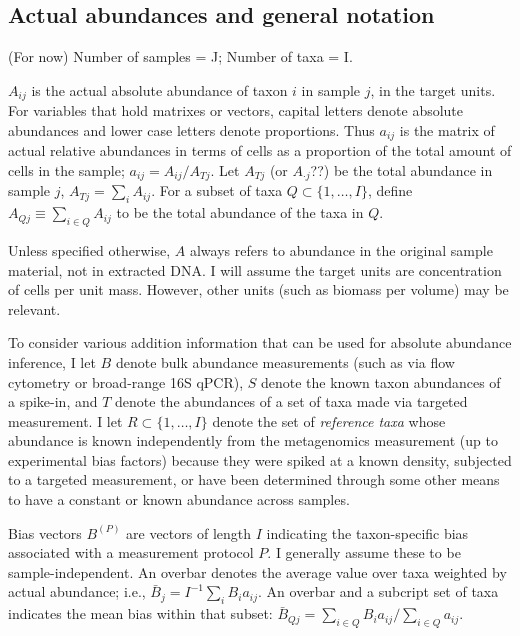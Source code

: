 \documentclass[
]{article}
\theoremstyle{definition}
\theoremstyle{definition}
\theoremstyle{definition}
\theoremstyle{definition}
\theoremstyle{remark}
\begin{document}
\hypertarget{actual-abundances-and-general-notation}{%
\subsection{Actual abundances and general notation}\label{actual-abundances-and-general-notation}}

(For now) Number of samples = J; Number of taxa = I.

\(A_{ij}\) is the actual absolute abundance of taxon \(i\) in sample \(j\), in the target units.
For variables that hold matrixes or vectors, capital letters denote absolute abundances and lower case letters denote proportions.
Thus \(a_{ij}\) is the matrix of actual relative abundances in terms of cells as a proportion of the total amount of cells in the sample; \(a_{ij} = A_{ij} / A_{Tj}\).
Let \(A_{Tj}\) (or \(A_{\cdot j}\)??) be the total abundance in sample \(j\), \(A_{Tj} = \sum_i A_{ij}\).
For a subset of taxa \(Q \subset \{1, \dots, I\}\), define \(A_{Qj} \equiv \sum_{i \in Q} A_{ij}\) to be the total abundance of the taxa in \(Q\).

Unless specified otherwise, \(A\) always refers to abundance in the original sample material, not in extracted DNA.
I will assume the target units are concentration of cells per unit mass. However, other units (such as biomass per volume) may be relevant.

To consider various addition information that can be used for absolute abundance inference, I let \(B\) denote bulk abundance measurements (such as via flow cytometry or broad-range 16S qPCR), \(S\) denote the known taxon abundances of a spike-in, and \(T\) denote the abundances of a set of taxa made via targeted measurement.
I let \(R \subset \{1, \dots, I\}\) denote the set of \emph{reference taxa} whose abundance is known independently from the metagenomics measurement (up to experimental bias factors) because they were spiked at a known density, subjected to a targeted measurement, or have been determined through some other means to have a constant or known abundance across samples.

Bias vectors \(B^{(P)}\) are vectors of length \(I\) indicating the taxon-specific bias associated with a measurement protocol \(P\).
I generally assume these to be sample-independent.
An overbar denotes the average value over taxa weighted by actual abundance; i.e., \(\bar B_j = I^{-1} \sum_i B_i a_{ij}\).
An overbar and a subcript set of taxa indicates the mean bias within that subset: \(\bar B_{Qj} = \sum_{i\in Q} B_i a_{ij} / \sum_{i\in Q} a_{ij}\).
\end{document}
